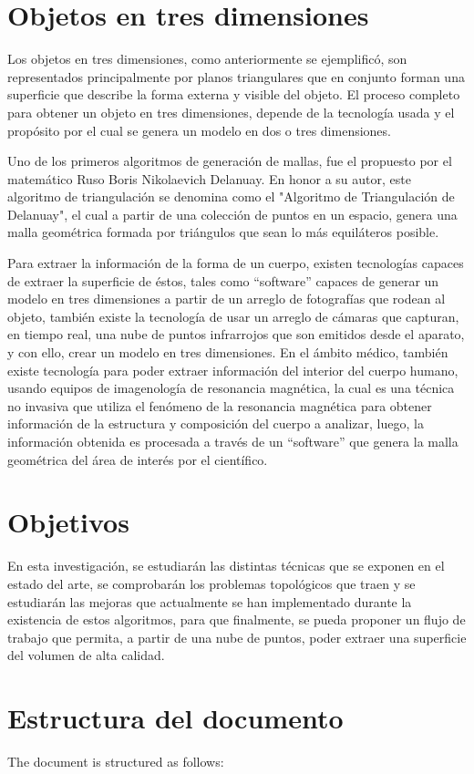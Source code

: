 \section{Objetos en tres dimensiones}
\label{sec:objectosEnTresDimensiones}
Los objetos en tres dimensiones, como anteriormente se ejemplificó, son representados 
principalmente por planos triangulares que en conjunto forman una superficie que describe la 
forma externa y visible del objeto. El proceso completo para obtener un objeto en tres 
dimensiones, depende de la tecnología usada y el propósito por el cual se genera un modelo en 
dos o tres dimensiones.

Uno de los primeros algoritmos de generación de mallas, fue el propuesto por el 
matemático Ruso Boris Nikolaevich Delanuay. En honor a su autor, este algoritmo de 
triangulación se denomina como el "Algoritmo de Triangulación de Delanuay", el cual a partir de 
una colección de puntos en un espacio, genera una malla geométrica formada por triángulos que 
sean lo más equiláteros posible.

Para extraer la información de la forma de un cuerpo, existen tecnologías capaces de 
extraer la superficie de éstos, tales como “software” capaces de generar un modelo en tres 
dimensiones a partir de un arreglo de fotografías que rodean al objeto, también existe la 
tecnología de usar un arreglo de cámaras que capturan, en tiempo real, una nube de puntos 
infrarrojos que son emitidos desde el aparato, y con ello, crear un modelo en tres dimensiones. En 
el ámbito médico, también existe tecnología para poder extraer información del interior del 
cuerpo humano, usando equipos de imagenología de resonancia magnética, la cual es una técnica 
no invasiva que utiliza el fenómeno de la resonancia magnética para obtener información de la 
estructura y composición del cuerpo a analizar, luego, la información obtenida es procesada a 
través de un “software” que genera la malla geométrica del área de interés por el científico.

\section{Objetivos}
\label{sec:objetivos}
En esta investigación, se estudiarán las distintas técnicas que se exponen en el estado del arte, %
se comprobarán los problemas topológicos que traen y se estudiarán las mejoras que actualmente se
han implementado durante la existencia de estos algoritmos, para que finalmente, se pueda proponer
un flujo de trabajo que permita, a partir de una nube de puntos, poder extraer una superficie del
volumen de alta calidad.

\section{Estructura del documento}
\label{sec:estructuraDelDocumento}
The document is structured as follows:
